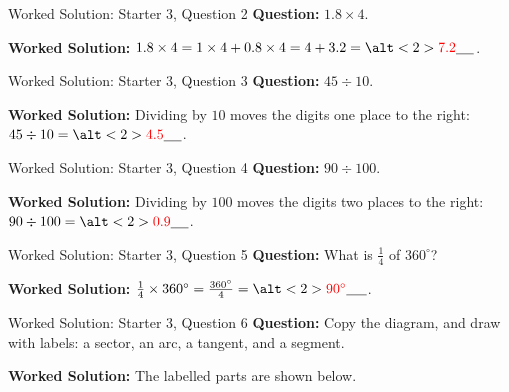 \documentclass{beamer}
\newcommand{\ablank}[1]{%
  \alt<2>{\textcolor{red}{#1}}{\underline{\phantom{#1}}}%
}
\begin{document}
\begin{frame}{Worked Solution: Starter 3, Question 2}
\small
\textbf{Question:} \(1.8\times4\).

\textbf{Worked Solution:} \(1.8\times4=1\times4+0.8\times4=4+3.2=\ablank{7.2}\).
\end{frame}

\begin{frame}{Worked Solution: Starter 3, Question 3}
\small
\textbf{Question:} \(45\div10\).

\textbf{Worked Solution:} Dividing by \(10\) moves the digits one place to the right:
\(45\div10=\ablank{4.5}\).
\end{frame}

\begin{frame}{Worked Solution: Starter 3, Question 4}
\small
\textbf{Question:} \(90\div100\).

\textbf{Worked Solution:} Dividing by \(100\) moves the digits two places to the right:
\(90\div100=\ablank{0.9}\).
\end{frame}

\begin{frame}{Worked Solution: Starter 3, Question 5}
\small
\textbf{Question:} What is \(\frac14\) of \(360^\circ\)?

\textbf{Worked Solution:} \(\frac14\times360^\circ=\frac{360^\circ}{4}=\ablank{90^\circ}\).
\end{frame}

\begin{frame}{Worked Solution: Starter 3, Question 6}
\small
\textbf{Question:} Copy the diagram, and draw with labels: a sector, an arc, a tangent, and a segment.

\textbf{Worked Solution:} The labelled parts are shown below.

\begin{center}
\end{center}
\end{frame}
\end{document}
